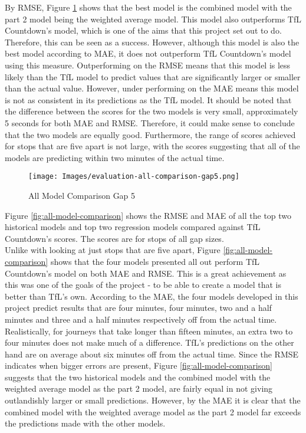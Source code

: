 By RMSE, Figure \ref{fig:all-model-comparison-gap5} shows that the best model is the combined model with the part 2 model being the weighted average model. This model also outperforms TfL Countdown's model, which is one of the aims that this project set out to do. Therefore, this can be seen as a success. However, although this model is also the best model according to MAE, it does not outperform TfL Countdown's model using this measure. Outperforming on the RMSE means that this model is less likely than the TfL model to predict values that are significantly larger or smaller than the actual value. However, under performing on the MAE means this model is not as consistent in its predictions as the TfL model. It should be noted that the difference between the scores for the two models is very small, approximately 5 seconds for both MAE and RMSE. Therefore, it could make sense to conclude that the two models are equally good. Furthermore, the range of scores achieved for stops that are five apart is not large, with the scores suggesting that all of the models are predicting within two minutes of the actual time. \\

\begin{figure}[H]
\begin{center}
    \texttt{[image: Images/evaluation-all-comparison-gap5.png]}
    \caption{All Model Comparison Gap 5}
    \label{fig:all-model-comparison-gap5}
\end{center}
\end{figure}

Figure \ref{fig:all-model-comparison} shows the RMSE and MAE of all the top two historical models and top two regression models compared against TfL Countdown's scores. The scores are for stops of all gap sizes. \\

Unlike with looking at just stops that are five apart, Figure \ref{fig:all-model-comparison} shows that the four models presented all out perform TfL Countdown's model on both MAE and RMSE. This is a great achievement as this was one of the goals of the project - to be able to create a model that is better than TfL's own. According to the MAE, the four models developed in this project predict results that are four minutes, four minutes, two and a half minutes and three and a half minutes respectively off from the actual time. Realistically, for journeys that take longer than fifteen minutes, an extra two to four minutes does not make much of a difference. TfL's predictions on the other hand are on average about six minutes off from the actual time. Since the RMSE indicates when bigger errors are present, Figure \ref{fig:all-model-comparison} suggests that the two historical models and the combined model with the weighted average model as the part 2 model, are fairly equal in not giving outlandishly larger or small predictions. However, by the MAE it is clear that the combined model with the weighted average model as the part 2 model far exceeds the predictions made with the other models.

